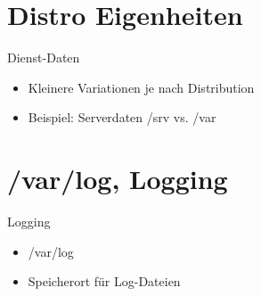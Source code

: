 \section[Dist.Eigen.]{Distro Eigenheiten}
\begin{frame}{Dienst-Daten}
\begin{itemize}
\item Kleinere Variationen je nach Distribution
\item Beispiel: Serverdaten /srv vs. /var
\end{itemize}
\end{frame}

\section[/var/log]{/var/log, Logging}
\begin{frame}{Logging}
\begin{itemize}
\item /var/log
\item Speicherort für Log-Dateien
\end{itemize}
\end{frame}